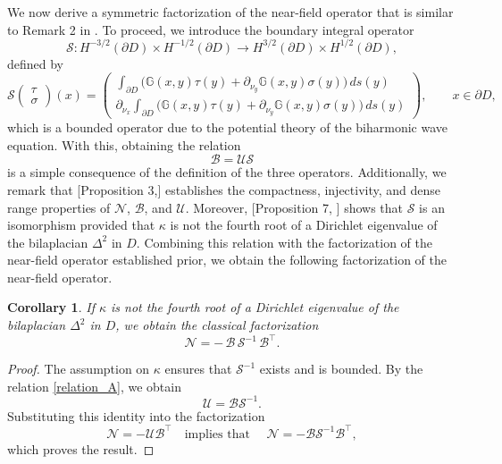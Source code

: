 \documentclass{article}
\newtheorem{Corollary}[Theorem]{Corollary}
\begin{document}
We now derive a symmetric factorization of the near-field operator that is similar to Remark 2 in \cite{BourgeoisRecoquillay2020}. To proceed, we introduce the boundary integral operator
\[
\mathcal S:
H^{-3/2}(\partial D)\times H^{-1/2}(\partial D)
\to
H^{3/2}(\partial D)\times H^{1/2}(\partial D),
\]
defined by
\begin{equation}\label{coercive_op}
\mathcal S
\begin{pmatrix}
\tau\\
\sigma
\end{pmatrix}
(x)
=
\begin{pmatrix}
\displaystyle \int_{\partial D}
\Big(
\mathbb G(x,y)\tau(y)
+
\partial_{\nu_y}\mathbb G(x,y)\sigma(y)
\Big)\,ds(y)
\\[1.5ex]
\displaystyle \partial_{\nu_x}\int_{\partial D}
\Big(
\mathbb G(x,y)\tau(y)
+
\partial_{\nu_y}\mathbb G(x,y)\sigma(y)
\Big)\,ds(y)
\end{pmatrix},
\qquad x\in \partial D,
\end{equation}
which is a bounded operator due to the potential theory of the biharmonic wave equation. With this, obtaining the relation
\begin{equation}\label{relation_A}
\mathcal B=\mathcal U\mathcal S
\end{equation}
is a simple consequence of the definition of the three operators. Additionally, we remark that [Proposition 3,\cite{BourgeoisRecoquillay2020}]
establishes the compactness, injectivity, and dense range properties of
$\mathcal N$, $\mathcal B$, and $\mathcal U$. Moreover, [Proposition 7,
\cite{BourgeoisRecoquillay2020}] shows that
$\mathcal S$ is an isomorphism provided that
$\kappa$ is not the fourth root of a Dirichlet eigenvalue of the
bilaplacian $\Delta^2$ in $D$.
Combining this relation with the factorization of the near-field operator
established prior, we obtain the following factorization of the near-field operator.
\begin{Corollary}\label{NF_factorization_thm}
If $\kappa$ is not the fourth root of a Dirichlet eigenvalue of the bilaplacian $\Delta^2$ in $D$, we obtain the classical factorization
\[
\mathcal N
=
-\,\mathcal B\,\mathcal S^{-1}\,\mathcal B^\top.
\]
\end{Corollary}
\begin{proof}
The assumption on $\kappa$ ensures that
$\mathcal S^{-1}$ exists and is bounded. By the
relation \eqref{relation_A}, we obtain
\[
\mathcal U=\mathcal B\mathcal S^{-1}.
\]
Substituting this identity into the factorization
\[
\mathcal N=-\mathcal U\mathcal B^\top \quad \text{implies that } \quad \mathcal N=-\mathcal B\mathcal S^{-1}\mathcal B^\top,
\]
which proves the result.
\end{proof}
\end{document}
